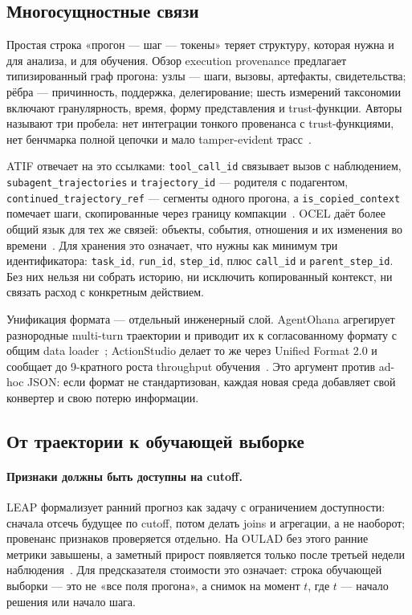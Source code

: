 \documentclass[11pt,a4paper]{article}
\begin{document}
\subsection{Многосущностные связи}

Простая строка «прогон — шаг — токены» теряет структуру, которая нужна и
для анализа, и для обучения. Обзор execution provenance предлагает
типизированный граф прогона: узлы — шаги, вызовы, артефакты, свидетельства;
рёбра — причинность, поддержка, делегирование; шесть измерений таксономии
включают гранулярность, время, форму представления и trust-функции. Авторы
называют три пробела: нет интеграции тонкого провенанса с trust-функциями,
нет бенчмарка полной цепочки и мало tamper-evident трасс~\cite{wang2026trust}.

ATIF отвечает на это ссылками: \texttt{tool\_call\_id} связывает вызов с
наблюдением, \texttt{subagent\_trajectories} и
\texttt{trajectory\_id} — родителя с подагентом,
\texttt{continued\_trajectory\_ref} — сегменты одного прогона, а
\texttt{is\_copied\_context} помечает шаги, скопированные через границу
компакции~\cite{atif2026}. OCEL даёт более общий язык для тех же связей:
объекты, события, отношения и их изменения во времени~\cite{berti2024ocel}.
Для хранения это означает, что нужны как минимум три идентификатора:
\texttt{task\_id}, \texttt{run\_id}, \texttt{step\_id}, плюс
\texttt{call\_id} и \texttt{parent\_step\_id}. Без них нельзя ни собрать
историю, ни исключить копированный контекст, ни связать расход с
конкретным действием.

Унификация формата — отдельный инженерный слой. AgentOhana агрегирует
разнородные multi-turn траектории и приводит их к согласованному
формату с общим data loader~\cite{zhang2024agentohana}; ActionStudio
делает то же через Unified Format 2.0 и сообщает до 9-кратного роста
throughput обучения~\cite{zhang2025actionstudio}. Это аргумент против
ad-hoc JSON: если формат не стандартизован, каждая новая среда добавляет
свой конвертер и свою потерю информации.

\subsection{От траектории к обучающей выборке}

\paragraph{Признаки должны быть доступны на cutoff.}
LEAP формализует ранний прогноз как задачу с ограничением доступности:
сначала отсечь будущее по cutoff, потом делать joins и агрегации, а не
наоборот; провенанс признаков проверяется отдельно. На OULAD без этого
ранние метрики завышены, а заметный прирост появляется только после
третьей недели наблюдения~\cite{le2026leap}. Для предсказателя стоимости
это означает: строка обучающей выборки — это не «все поля прогона», а
снимок на момент $t$, где $t$ — начало решения или начало шага.
\end{document}

